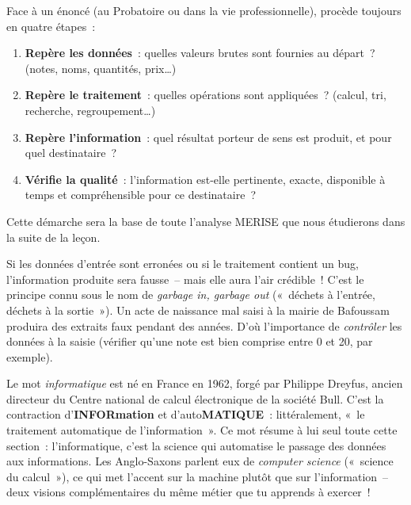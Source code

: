 \documentclass[11pt]{article}
\begin{document}
\begin{methode}
Face à un énoncé (au Probatoire ou dans la vie professionnelle), procède toujours en quatre étapes~:
\begin{enumerate}
\item \textbf{Repère les données}~: quelles valeurs brutes sont fournies au départ~? (notes, noms, quantités, prix\ldots)
\item \textbf{Repère le traitement}~: quelles opérations sont appliquées~? (calcul, tri, recherche, regroupement\ldots)
\item \textbf{Repère l'information}~: quel résultat porteur de sens est produit, et pour quel destinataire~?
\item \textbf{Vérifie la qualité}~: l'information est-elle pertinente, exacte, disponible à temps et compréhensible pour ce destinataire~?
\end{enumerate}
Cette démarche sera la base de toute l'analyse MERISE que nous étudierons dans la suite de la leçon.
\end{methode}

\begin{attention}
Si les données d'entrée sont erronées ou si le traitement contient un bug, l'information produite sera fausse~-- mais elle aura l'air crédible~! C'est le principe connu sous le nom de \emph{garbage in, garbage out} («~déchets à l'entrée, déchets à la sortie~»). Un acte de naissance mal saisi à la mairie de Bafoussam produira des extraits faux pendant des années. D'où l'importance de \emph{contrôler} les données à la saisie (vérifier qu'une note est bien comprise entre 0 et 20, par exemple).
\end{attention}

\begin{savaistu}
Le mot \emph{informatique} est né en France en 1962, forgé par Philippe Dreyfus, ancien directeur du Centre national de calcul électronique de la société Bull. C'est la contraction d'\textbf{INFORmation} et d'auto\textbf{MATIQUE}~: littéralement, «~le traitement automatique de l'information~». Ce mot résume à lui seul toute cette section~: l'informatique, c'est la science qui automatise le passage des données aux informations. Les Anglo-Saxons parlent eux de \emph{computer science} («~science du calcul~»), ce qui met l'accent sur la machine plutôt que sur l'information~-- deux visions complémentaires du même métier que tu apprends à exercer~!
\end{savaistu}
\end{document}
